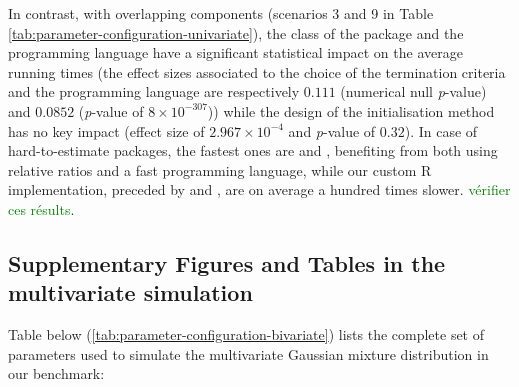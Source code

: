 In contrast, with overlapping components (scenarios 3 and 9 in Table
\ref{tab:parameter-configuration-univariate}), the class of the
package and the programming language have a significant statistical impact on the average running
times (the effect sizes associated to the
choice of the termination criteria and the programming language are
respectively \(0.111\) (numerical null \emph{p}-value) and \(0.0852\) (\emph{p}-value of
\(8 \times 10^{-307}\))) while the design of the initialisation method has no key impact (effect size of
\(2.967 \times 10^{-4}\) and \emph{p}-value of \(0.32\)). In case of hard-to-estimate packages, the fastest ones are  and , benefiting from both using
relative ratios and a fast programming language, while our
custom R implementation, preceded by  and ,
are on average a hundred times slower.
\textcolor{green}{vérifier ces résults}.

\newpage

\hypertarget{supplementary-figures-and-tables-in-the-multivariate-simulation}{%
\subsection{Supplementary Figures and Tables in the multivariate simulation}\label{supplementary-figures-and-tables-in-the-multivariate-simulation}}

Table below (\ref{tab:parameter-configuration-bivariate}) lists the complete set of parameters used to simulate the multivariate Gaussian mixture distribution in our benchmark:

